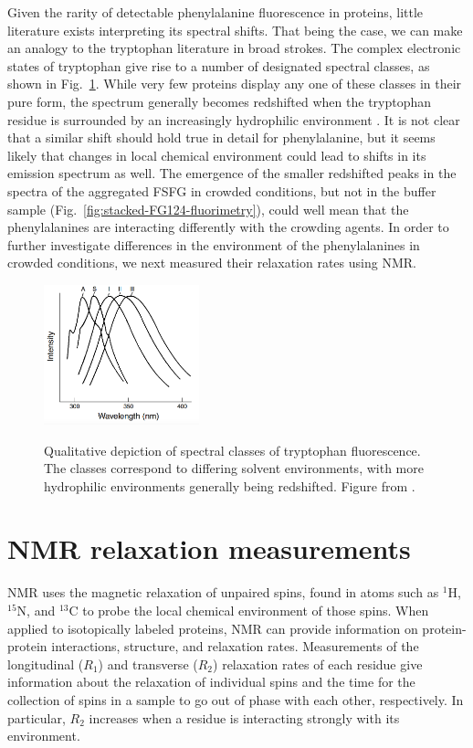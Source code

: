 Given the rarity of detectable phenylalanine fluorescence in proteins, little literature exists interpreting its spectral shifts.  That being the case, we can make an analogy to the tryptophan literature in broad strokes.   The complex electronic states of tryptophan give rise to a number of designated spectral classes, as shown in Fig.~\ref{fig:tryptophan}.  While very few proteins display any one of these classes in their pure form, the spectrum generally becomes redshifted when the tryptophan residue is surrounded by an increasingly hydrophilic environment \cite{ladokhin00,serrano-andres96}.  It is not clear that a similar shift should hold true in detail for phenylalanine, but it seems likely that changes in local chemical environment could lead to shifts in its emission spectrum as well.  The emergence of the smaller redshifted peaks in the spectra of the aggregated FSFG in crowded conditions, but not in the buffer sample (Fig.~\ref{fig:stacked-FG124-fluorimetry}), could well mean that the phenylalanines are interacting differently with the crowding agents.   In order to further investigate differences in the environment of the phenylalanines in crowded conditions, we next measured their relaxation rates using NMR.

\begin{figure}
\caption[Classes of tryptophan fluorescence.]{Qualitative depiction of spectral classes of tryptophan fluorescence. The classes correspond to differing solvent environments, with more hydrophilic environments generally being redshifted.  Figure from \cite{ladokhin00}.}
\centering
\includegraphics[width=0.4\textwidth]{figs/ch05/trytophan-ladokhin.png}
\label{fig:tryptophan}
\end{figure}


\section{NMR relaxation measurements}

NMR uses the magnetic relaxation of unpaired spins, found in atoms such as $^1$H, $^{15}$N, and $^{13}$C to probe the local chemical environment of those spins.  When applied to isotopically labeled proteins, NMR can provide information on protein-protein interactions, structure, and relaxation rates.  Measurements of the longitudinal ($R_1$) and transverse ($R_2$) relaxation rates of each residue give information about the relaxation of individual spins and the time for the collection of spins in a sample to go out of phase with each other, respectively.  In particular, $R_2$ increases when a residue is interacting strongly with its environment.

